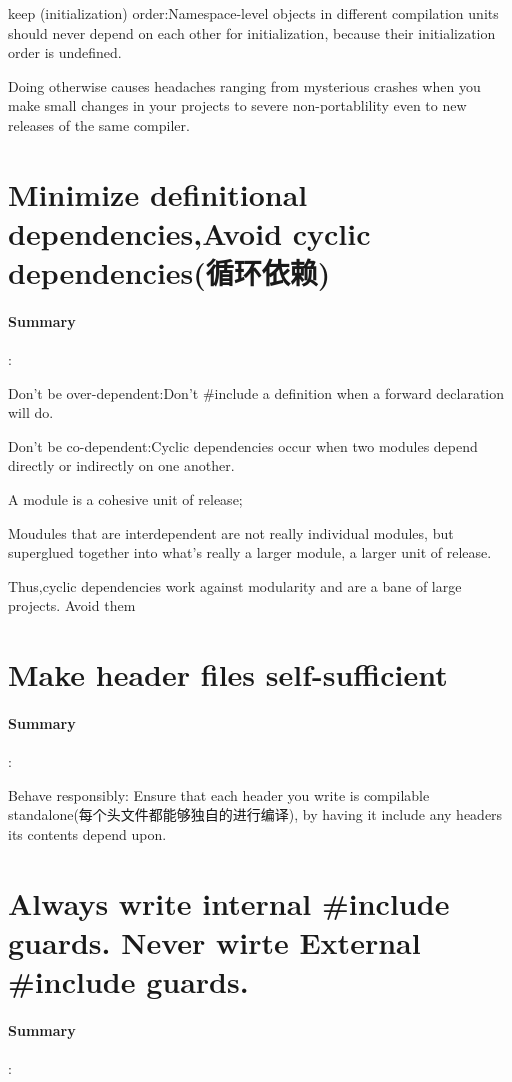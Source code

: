 \documentclass[UTF8,a4paper,12pt]{ctexbook}
\begin{document}
			keep (initialization) order:Namespace-level objects in different compilation units should never depend on each other for initialization, because their initialization order is undefined.
			
			Doing otherwise causes headaches ranging from mysterious crashes when you make small changes in your projects to severe non-portablility even to new releases of the same compiler.
		
	\section{Minimize definitional dependencies,Avoid cyclic dependencies(循环依赖)}
		\paragraph{Summary}:
		
			Don't be over-dependent:Don't \#include a definition when a forward declaration will do.
			
			Don't be co-dependent:Cyclic dependencies occur when two modules depend directly or indirectly on one another.
			
			A module is a cohesive unit of release;
			
			Moudules that are interdependent are not really individual modules, but superglued together into what's really a larger module, a larger unit of release.
			
			Thus,cyclic dependencies work against modularity and are a bane of large projects. Avoid them
		
	\section{Make header files self-sufficient}
		\paragraph{Summary}:
			
			Behave responsibly: Ensure that each header you write is compilable standalone(每个头文件都能够独自的进行编译), by having it include any headers its contents depend upon.
		
	\section{Always write internal \#include guards. Never wirte External \#include guards.}
		\paragraph{Summary}:
		
\end{document}
